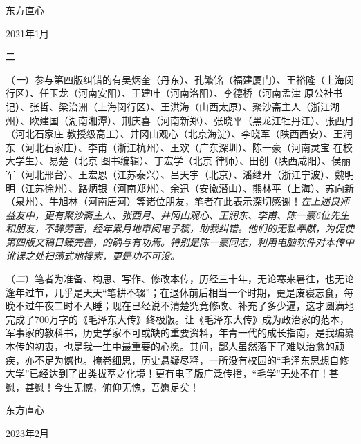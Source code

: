 \documentclass[../../dazhuan.tex]{subfiles}
\begin{document}
\begin{sign}
东方直心
	
2021年1月
\end{sign}

{\centering {}\kaishu 二 \par}   
 
（\emph{一}）参与第四版纠错的有吴炳奎（丹东）、孔繁铭（福建厦门）、王裕隆（上海闵行区）、任玉龙（河南安阳）、王建叶（河南洛阳）、李德桥（河南孟津 原公社书记）、张哲、梁治洲（上海闵行区）、王洪海（山西太原）、聚沙斋主人（浙江湖州）、欧建国（湖南湘潭）、荆庆喜（河南新郑）、张晓平（黑龙江牡丹江）、张西月（河北石家庄 教授级高工）、井冈山观心（北京海淀）、李晓军（陕西西安）、王润东（河北石家庄）、李甫（浙江杭州）、王欢（广东深圳）、陈一豪（河南灵宝 在校大学生）、易楚（北京 图书编辑）、丁宏学（北京 律师）、田创（陕西咸阳）、侯丽军（河北邢台）、王宏恩（江苏泰兴）、吕天宇（北京）、潘继开（浙江宁波）、魏明明（江苏徐州）、路炳银（河南郑州）、余迅（安徽潜山）、熊林平（上海）、苏向新（泉州）、牛旭林（河南唐河）等诸位朋友，笔者在此表示深切感谢！\emph{在上述良师益友中，更有聚沙斋主人、张西月、井冈山观心、王润东、李甫、陈一豪6位先生和朋友，不辞劳苦，经年累月地审阅电子稿，助我纠错。他们的无私奉献，为促使第四版文稿日臻完善，的确与有功焉。特别是陈一豪同志，利用电脑软件对本传中讹误之处扫荡式地搜索，更是功不可没。}

（\emph{二}）笔者为准备、构思、写作、修改本传，历经三十年，无论寒来暑往，也无论逢年过节，几乎是天天“笔耕不辍”；在退休前后相当一个时期，更是废寝忘食，每晚不过午夜二时不入睡；现在已经说不清楚究竟修改、补充了多少遍，这才圆满地完成了700万字的《毛泽东大传》终极版。让《毛泽东大传》成为政治家的范本，军事家的教科书，历史学家不可或缺的重要资料，年青一代的成长指南，是我编纂本传的初衷，也是我一生中最重要的心愿。其间，鄙人虽然落下了难以治愈的顽疾，亦不足为憾也。掩卷细思，历史悬疑尽释，一所没有校园的“毛泽东思想自修大学”已经达到了出类拔萃之化境！更有电子版广泛传播，“毛学”无处不在！甚慰，甚慰！今生无憾，俯仰无愧，吾愿足矣！


\begin{sign}
	东方直心
	
	2023年2月
\end{sign}
    
\end{document}

